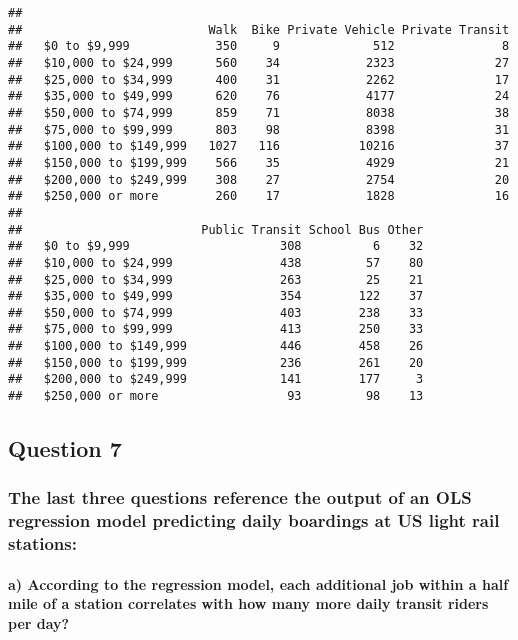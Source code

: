 \documentclass[
]{article}
\begin{document}
\begin{verbatim}
##                        
##                          Walk  Bike Private Vehicle Private Transit
##   $0 to $9,999            350     9             512               8
##   $10,000 to $24,999      560    34            2323              27
##   $25,000 to $34,999      400    31            2262              17
##   $35,000 to $49,999      620    76            4177              24
##   $50,000 to $74,999      859    71            8038              38
##   $75,000 to $99,999      803    98            8398              31
##   $100,000 to $149,999   1027   116           10216              37
##   $150,000 to $199,999    566    35            4929              21
##   $200,000 to $249,999    308    27            2754              20
##   $250,000 or more        260    17            1828              16
##                        
##                         Public Transit School Bus Other
##   $0 to $9,999                     308          6    32
##   $10,000 to $24,999               438         57    80
##   $25,000 to $34,999               263         25    21
##   $35,000 to $49,999               354        122    37
##   $50,000 to $74,999               403        238    33
##   $75,000 to $99,999               413        250    33
##   $100,000 to $149,999             446        458    26
##   $150,000 to $199,999             236        261    20
##   $200,000 to $249,999             141        177     3
##   $250,000 or more                  93         98    13
\end{verbatim}

\hypertarget{question-7}{%
\subsection{Question 7}\label{question-7}}

\hypertarget{the-last-three-questions-reference-the-output-of-an-ols-regression-model-predicting-daily-boardings-at-us-light-rail-stations}{%
\subsubsection{The last three questions reference the output of an OLS
regression model predicting daily boardings at US light rail
stations:}\label{the-last-three-questions-reference-the-output-of-an-ols-regression-model-predicting-daily-boardings-at-us-light-rail-stations}}

\hypertarget{a-according-to-the-regression-model-each-additional-job-within-a-half-mile-of-a-station-correlates-with-how-many-more-daily-transit-riders-per-day}{%
\paragraph{a) According to the regression model, each additional job
within a half mile of a station correlates with how many more daily
transit riders per
day?}\label{a-according-to-the-regression-model-each-additional-job-within-a-half-mile-of-a-station-correlates-with-how-many-more-daily-transit-riders-per-day}}
\end{document}
